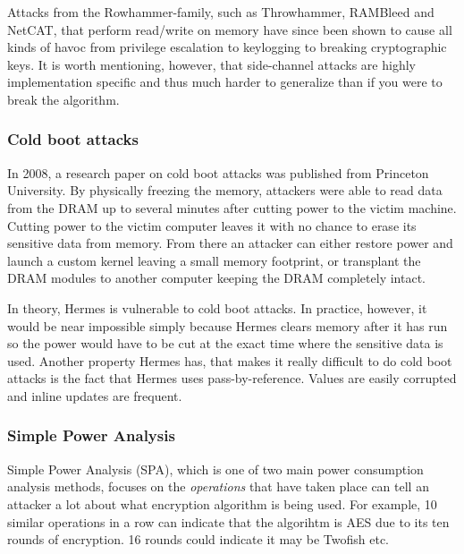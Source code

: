 Attacks from the Rowhammer-family, such as Throwhammer, RAMBleed and NetCAT, that perform read/write on memory have since been shown to cause all kinds of havoc from privilege escalation to keylogging to breaking cryptographic keys\cite{tatar_throwhammer:_2018}\cite{kwong2020rambleed}\cite{kurth_netcat:_2020}.
It is worth mentioning, however, that side-channel attacks are highly implementation specific and thus much harder to generalize than if you were to break the algorithm.

\subsubsection{Cold boot attacks}
In 2008, a research paper on cold boot attacks\cite{Halderman2008LestKeys} was published from Princeton University. By physically freezing the memory, attackers were able to read data from the DRAM up to several minutes after cutting power to the victim machine. Cutting power to the victim computer leaves it with no chance to erase its sensitive data from memory. From there an attacker can either restore power and launch a custom kernel leaving a small memory footprint, or transplant the DRAM modules to another computer keeping the DRAM completely intact.

In theory, Hermes is vulnerable to cold boot attacks. In practice, however, it would be near impossible simply because Hermes clears memory after it has run so the power would have to be cut at the exact time where the sensitive data is used. Another property Hermes has, that makes it really difficult to do cold boot attacks is the fact that Hermes uses pass-by-reference. Values are easily corrupted and inline updates are frequent.

\subsubsection{Simple Power Analysis}
Simple Power Analysis (SPA), which is one of two main power consumption analysis methods, focuses on the \emph{operations} that have taken place can tell an attacker a lot about what encryption algorithm is being used.
For example, 10 similar operations in a row can indicate that the algorihtm is AES due to its ten rounds of encryption. 16 rounds could indicate it may be Twofish etc.

